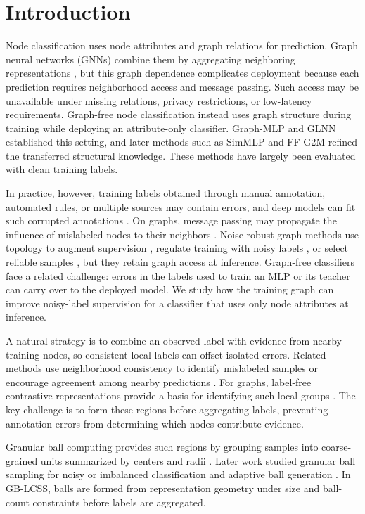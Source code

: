 \documentclass[times,review,10pt]{elsarticle}
\theoremstyle{definition}
\theoremstyle{plain}
\begin{document}
\section{Introduction}\label{sec:1}

Node classification uses node attributes and graph relations for prediction. Graph neural networks (GNNs) combine them by aggregating neighboring representations \cite{ref1}, but this graph dependence complicates deployment because each prediction requires neighborhood access and message passing. Such access may be unavailable under missing relations, privacy restrictions, or low-latency requirements. Graph-free node classification instead uses graph structure during training while deploying an attribute-only classifier. Graph-MLP \cite{ref3} and GLNN \cite{ref4} established this setting, and later methods such as SimMLP \cite{ref41} and FF-G2M \cite{ref45} refined the transferred structural knowledge. These methods have largely been evaluated with clean training labels.

In practice, however, training labels obtained through manual annotation, automated rules, or multiple sources may contain errors, and deep models can fit such corrupted annotations \cite{ref24}. On graphs, message passing may propagate the influence of mislabeled nodes to their neighbors \cite{ref6}. Noise-robust graph methods use topology to augment supervision \cite{ref7}, regulate training with noisy labels \cite{ref8}, or select reliable samples \cite{ref9}, but they retain graph access at inference. Graph-free classifiers face a related challenge: errors in the labels used to train an MLP or its teacher can carry over to the deployed model. We study how the training graph can improve noisy-label supervision for a classifier that uses only node attributes at inference.

A natural strategy is to combine an observed label with evidence from nearby training nodes, so consistent local labels can offset isolated errors. Related methods use neighborhood consistency to identify mislabeled samples or encourage agreement among nearby predictions \cite{ref10,ref11}. For graphs, label-free contrastive representations provide a basis for identifying such local groups \cite{ref12}. The key challenge is to form these regions before aggregating labels, preventing annotation errors from determining which nodes contribute evidence.

Granular ball computing provides such regions by grouping samples into coarse-grained units summarized by centers and radii \cite{ref13}. Later work studied granular ball sampling for noisy or imbalanced classification \cite{ref15} and adaptive ball generation \cite{ref16}. In GB-LCSS, balls are formed from representation geometry under size and ball-count constraints before labels are aggregated.
\end{document}
